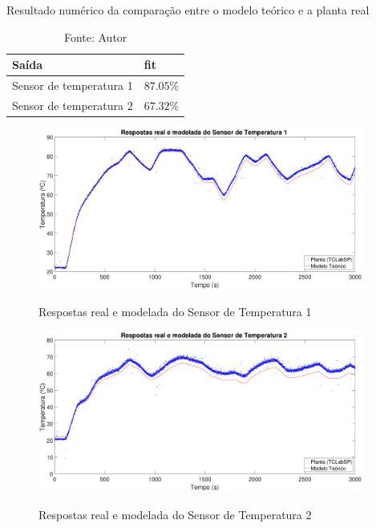 \begin{table}[h]
	\centering
	\caption{Resultado numérico da comparação entre o modelo teórico e a planta real}
	\label{tab:ModeloTeorico_e_TCLabSP_results}
	\begin{tabular}{ll} \toprule
		{Saída}								& {fit}					\\ \midrule
		Sensor de temperatura 1				& $87.05\%$				\\
		Sensor de temperatura 2				& $67.32\%$				\\ \bottomrule
	\end{tabular}
	\caption*{Fonte: Autor}
\end{table}

\begin{figure}[h]
	\caption{Respostas real e modelada do Sensor de Temperatura 1}
	\begin{center}
		\includegraphics[width=0.95\textwidth]{./5_images/ModeloTeorico_e_TCLabSP_y1.eps} 
		\label{fig:ModeloTeorico_e_TCLabSP_y1}
	\end{center}
	\centering
\end{figure}

\begin{figure}[h]
	\caption{Respostas real e modelada do Sensor de Temperatura 2}
	\begin{center}
		\includegraphics[width=0.95\textwidth]{./5_images/ModeloTeorico_e_TCLabSP_y2.eps} 
		\label{fig:ModeloTeorico_e_TCLabSP_y2}
	\end{center}
	\centering
\end{figure}
